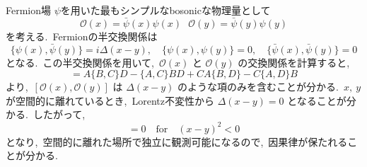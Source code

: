 \documentclass[uplatex,dvipdfmx]{jsarticle}
\begin{document}
Fermion場 $\psi$を用いた最もシンプルなbosonicな物理量として
\begin{equation*}
     \mathcal{O}(x) = \bar{\psi}(x)\psi(x) ~~~\mathcal{O}(y) = \bar{\psi}(y)\psi(y)
\end{equation*}
を考える.~Fermionの半交換関係は
\begin{equation*}
    \{\psi(x), \bar{\psi}(y)\} = i\Delta(x-y), \quad \{\psi(x), \psi(y)\} = 0, \quad \{\bar{\psi}(x), \bar{\psi}(y)\} = 0
\end{equation*}
となる.~この半交換関係を用いて,~$\mathcal{O}(x)$ と $\mathcal{O}(y)$ の交換関係を計算すると,
\begin{equation*}
    [AB, CD] = A\{B, C\}D - \{A, C\}BD + C A\{B, D\} - C\{A, D\}B
\end{equation*}
より,~$[\mathcal{O}(x), \mathcal{O}(y)]$ は $\Delta(x-y)$ のような項のみを含むことが分かる.~$x,~y$が空間的に離れているとき,~Lorentz不変性から $\Delta(x-y) = 0$ となることが分かる.~したがって,~
\begin{equation*}
    [\mathcal{O}(x), \mathcal{O}(y)] = 0 \quad \text{for} \quad (x-y)^2 < 0
\end{equation*}
となり,~空間的に離れた場所で独立に観測可能になるので,~因果律が保たれることが分かる.
\end{document}

